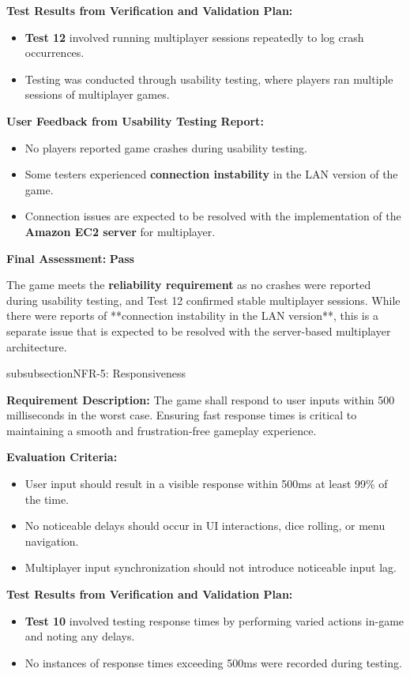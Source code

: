 \documentclass[12pt, titlepage]{article}
\begin{document}
\textbf{Test Results from Verification and Validation Plan:}  
\begin{itemize}
    \item \textbf{Test 12} involved running multiplayer sessions repeatedly to log crash occurrences.
    \item Testing was conducted through usability testing, where players ran multiple sessions of multiplayer games.
\end{itemize}

\textbf{User Feedback from Usability Testing Report:}  
\begin{itemize}
    \item No players reported game crashes during usability testing.
    \item Some testers experienced \textbf{connection instability} in the LAN version of the game.
    \item Connection issues are expected to be resolved with the implementation of the \textbf{Amazon EC2 server} for multiplayer.
\end{itemize}

\textbf{Final Assessment:} \textbf{Pass}  

The game meets the \textbf{reliability requirement} as no crashes were reported during usability testing, and Test 12 confirmed stable multiplayer sessions. While there were reports of **connection instability in the LAN version**, this is a separate issue that is expected to be resolved with the server-based multiplayer architecture.

\*subsubsection{NFR-5: Responsiveness}

\textbf{Requirement Description:}  
The game shall respond to user inputs within 500 milliseconds in the worst case. Ensuring fast response times is critical to maintaining a smooth and frustration-free gameplay experience.

\textbf{Evaluation Criteria:}  
\begin{itemize}
    \item User input should result in a visible response within 500ms at least 99\% of the time.
    \item No noticeable delays should occur in UI interactions, dice rolling, or menu navigation.
    \item Multiplayer input synchronization should not introduce noticeable input lag.
\end{itemize}

\textbf{Test Results from Verification and Validation Plan:}  
\begin{itemize}
    \item \textbf{Test 10} involved testing response times by performing varied actions in-game and noting any delays.
    \item No instances of response times exceeding 500ms were recorded during testing.
\end{itemize}
\end{document}
